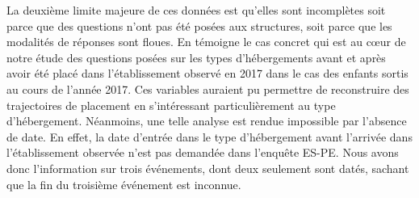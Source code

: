 \documentclass[
  12,
  a4paper,
]{report}
\begin{document}
La deuxième limite majeure de ces données est qu'elles sont incomplètes
soit parce que des questions n'ont pas été posées aux structures, soit
parce que les modalités de réponses sont floues. En témoigne le cas
concret qui est au cœur de notre étude des questions posées sur les
types d'hébergements avant et après avoir été placé dans l'établissement
observé en 2017 dans le cas des enfants sortis au cours de l'année 2017.
Ces variables auraient pu permettre de reconstruire des trajectoires de
placement en s'intéressant particulièrement au type d'hébergement.
Néanmoins, une telle analyse est rendue impossible par l'absence de
date. En effet, la date d'entrée dans le type d'hébergement avant
l'arrivée dans l'établissement observée n'est pas demandée dans
l'enquête ES-PE. Nous avons donc l'information sur trois événements,
dont deux seulement sont datés, sachant que la fin du troisième
événement est inconnue.
\end{document}
